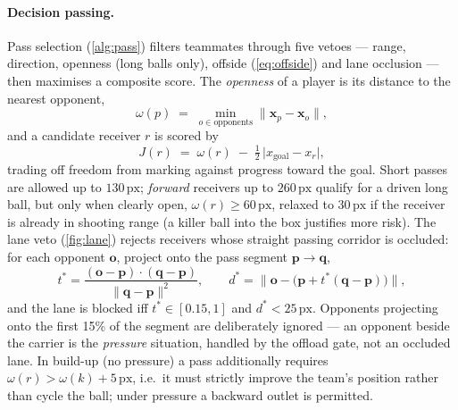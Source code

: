 \documentclass[10pt,twocolumn]{article}
\newcommand{\px}{\ensuremath{\,\mathrm{px}}}
\begin{document}
\paragraph{Decision passing.} Pass selection
(\cref{alg:pass}) filters teammates through five vetoes --- range,
direction, openness (long balls only), offside (\cref{eq:offside}) and
lane occlusion --- then maximises a composite score. The \emph{openness}
of a player is its distance to the nearest opponent,
\begin{equation}\label{eq:openness}
\omega(p) \;=\; \min_{o \in \text{opponents}} \lVert \mathbf x_p - \mathbf x_o \rVert ,
\end{equation}
and a candidate receiver $r$ is scored by
\begin{equation}\label{eq:passscore}
J(r) \;=\; \omega(r) \;-\; \tfrac{1}{2}\,\bigl| x_{\text{goal}} - x_r \bigr|,
\end{equation}
trading off freedom from marking against progress toward the goal. Short
passes are allowed up to $130\px$; \emph{forward} receivers up to $260\px$
qualify for a driven long ball, but only when clearly open,
$\omega(r) \ge 60\px$, relaxed to $30\px$ if the receiver is already in
shooting range (a killer ball into the box justifies more risk). The lane
veto (\cref{fig:lane}) rejects receivers whose straight passing corridor
is occluded: for each opponent $\mathbf o$, project onto the pass segment
$\mathbf p \to \mathbf q$,
\begin{equation}\label{eq:lane}
t^{\ast} = \frac{(\mathbf o - \mathbf p)\cdot(\mathbf q - \mathbf p)}
               {\lVert \mathbf q - \mathbf p \rVert^{2}},
\qquad
d^{\ast} = \bigl\lVert \mathbf o - \bigl(\mathbf p + t^{\ast}(\mathbf q - \mathbf p)\bigr) \bigr\rVert,
\end{equation}
and the lane is blocked iff $t^{\ast} \in [0.15, 1]$ and $d^{\ast} < 25\px$.
Opponents projecting onto the first 15\% of the segment are deliberately
ignored --- an opponent beside the carrier is the \emph{pressure}
situation, handled by the offload gate, not an occluded lane. In build-up
(no pressure) a pass additionally requires
$\omega(r) > \omega(k) + 5\px$, i.e.\ it must strictly improve the team's
position rather than cycle the ball; under pressure a backward outlet is
permitted.
\end{document}
